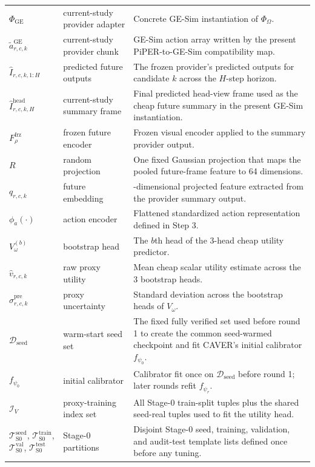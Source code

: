 \documentclass[10pt]{article}
\theoremstyle{plain}
\theoremstyle{definition}
\theoremstyle{remark}
\begin{document}
{\begin{longtable}{@{}>{\raggedright\arraybackslash}p{3.25cm}>{\raggedright\arraybackslash}p{2.55cm}>{\raggedright\arraybackslash}p{8.35cm}@{}}
$\Phi_{\mathrm{GE}}$ & current-study provider adapter & Concrete GE-Sim instantiation of $\Phi_{\Omega}$. \\
$\tilde a^{\mathrm{GE}}_{r,c,k}$ & current-study provider chunk & GE-Sim action array written by the present PiPER-to-GE-Sim compatibility map. \\
$\hat I_{r,c,k,1:H}$ & predicted future outputs & The frozen provider's predicted outputs for candidate $k$ across the $H$-step horizon. \\
$\hat I^{\mathrm{head}}_{r,c,k,H}$ & current-study summary frame & Final predicted head-view frame used as the cheap future summary in the present GE-Sim instantiation. \\
$F_{\rho}^{\mathrm{frz}}$ & frozen future encoder & Frozen visual encoder applied to the summary provider output. \\
$R$ & random projection & One fixed Gaussian projection that maps the pooled future-frame feature to 64 dimensions. \\
$q_{r,c,k}$ & future embedding & 64-dimensional projected feature extracted from the provider summary output. \\
$\phi_a(\cdot)$ & action encoder & Flattened standardized action representation defined in Step 3. \\
$V_{\omega}^{(b)}$ & bootstrap head & The $b$th head of the 3-head cheap utility predictor. \\
$\hat v_{r,c,k}$ & raw proxy utility & Mean cheap scalar utility estimate across the 3 bootstrap heads. \\
$\hat \sigma^{\mathrm{pre}}_{r,c,k}$ & proxy uncertainty & Standard deviation across the bootstrap heads of $V_{\omega}$. \\
$\mathcal D_{\mathrm{seed}}$ & warm-start seed set & The fixed fully verified set used before round 1 to create the common seed-warmed checkpoint and fit CAVER's initial calibrator $f_{\psi_0}$. \\
$f_{\psi_0}$ & initial calibrator & Calibrator fit once on $\mathcal D_{\mathrm{seed}}$ before round 1; later rounds refit $f_{\psi_r}$. \\
$\mathcal I_V$ & proxy-training index set & All Stage-0 train-split tuples plus the shared seed-real tuples used to fit the utility head. \\
\(\mathcal T^{\mathrm{seed}}_{\mathrm{S0}}\), \(\mathcal T^{\mathrm{train}}_{\mathrm{S0}}\), \(\mathcal T^{\mathrm{val}}_{\mathrm{S0}}\), \(\mathcal T^{\mathrm{test}}_{\mathrm{S0}}\) & Stage-0 partitions & Disjoint Stage-0 seed, training, validation, and audit-test template lists defined once before any tuning. \\

\end{longtable}}
\end{document}
